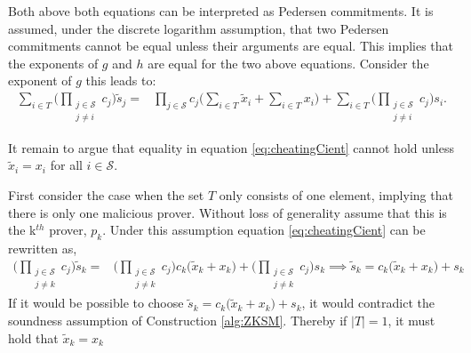 Both above both equations can be interpreted as Pedersen commitments.  It is assumed, under the discrete logarithm assumption, that two Pedersen commitments cannot be equal unless their arguments are equal. This implies that the exponents of $g$ and $h$ are equal for the two above equations. Consider the exponent of $g$ this leads to:
\begin{align}
\label{eq:cheatingCient}
\sum_{i\in T} \big(\prod_{\substack{j\in\mathcal{S}\\ j\neq i}} c_j \big) \tilde{s}_j =& \prod_{j\in\mathcal{S}} c_j \big(\sum_{i\in T} \tilde{x}_i + \sum_{i\in T} x_i\big) + \sum_{i\in T} \big( \prod_{\substack{j\in\mathcal{S}\\ j\neq i}} c_j\big) s_i  . 
\end{align}

It remain to argue that equality in equation \eqref{eq:cheatingCient} cannot hold unless $\tilde{x}_i= x_i$ for all $i\in\mathcal{S}$.

First consider the case when the set $T$ only consists of one element, implying that there is only one malicious prover. Without loss of generality assume that this is the k$^{th}$ prover, $p_k$. Under this assumption equation \eqref{eq:cheatingCient} can be rewritten as, 
\begin{align*}
\big(\prod_{\substack{j\in\mathcal{S}\\ j\neq k}} c_j \big)  \tilde{s}_k  =& \big ( \prod_{\substack{j\in\mathcal{S}\\ j\neq k}} c_j \big)c_k \big( \tilde{x}_k + x_k\big) +\big( \prod_{\substack{j\in\mathcal{S}\\ j\neq k}} c_j\big) s_k  \implies   \tilde{s}_k  = c_k \big( \tilde{x}_k + x_k\big) + s_k
\end{align*}
If it would be possible to choose $\tilde{s}_k = c_k \big( \tilde{x}_k + x_k\big) + s_k $, it would contradict the soundness assumption of Construction \ref{alg:ZKSM}. Thereby if $|T|=1$, it must hold that $\tilde{x}_k=x_k$

